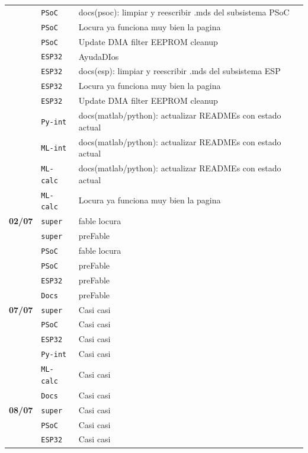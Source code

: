 \begin{longtable}{@{}p{1.7cm} p{1.5cm} p{12.2cm}@{}}
 & \texttt{\scriptsize PSoC} & docs(psoc): limpiar y reescribir .mds del subsistema PSoC \\
 & \texttt{\scriptsize PSoC} & Locura ya funciona muy bien la pagina \\
 & \texttt{\scriptsize PSoC} & Update DMA filter EEPROM cleanup \\
 & \texttt{\scriptsize ESP32} & AyudaDIos \\
 & \texttt{\scriptsize ESP32} & docs(esp): limpiar y reescribir .mds del subsistema ESP \\
 & \texttt{\scriptsize ESP32} & Locura ya funciona muy bien la pagina \\
 & \texttt{\scriptsize ESP32} & Update DMA filter EEPROM cleanup \\
 & \texttt{\scriptsize Py-int} & docs(matlab/python): actualizar READMEs con estado actual \\
 & \texttt{\scriptsize ML-int} & docs(matlab/python): actualizar READMEs con estado actual \\
 & \texttt{\scriptsize ML-calc} & docs(matlab/python): actualizar READMEs con estado actual \\
 & \texttt{\scriptsize ML-calc} & Locura ya funciona muy bien la pagina \\
\textbf{02/07} & \texttt{\scriptsize super} & fable locura \\
 & \texttt{\scriptsize super} & preFable \\
 & \texttt{\scriptsize PSoC} & fable locura \\
 & \texttt{\scriptsize PSoC} & preFable \\
 & \texttt{\scriptsize ESP32} & preFable \\
 & \texttt{\scriptsize Docs} & preFable \\
\textbf{07/07} & \texttt{\scriptsize super} & Casi casi \\
 & \texttt{\scriptsize PSoC} & Casi casi \\
 & \texttt{\scriptsize ESP32} & Casi casi \\
 & \texttt{\scriptsize Py-int} & Casi casi \\
 & \texttt{\scriptsize ML-calc} & Casi casi \\
 & \texttt{\scriptsize Docs} & Casi casi \\
\textbf{08/07} & \texttt{\scriptsize super} & Casi casi \\
 & \texttt{\scriptsize PSoC} & Casi casi \\
 & \texttt{\scriptsize ESP32} & Casi casi \\

\end{longtable}
